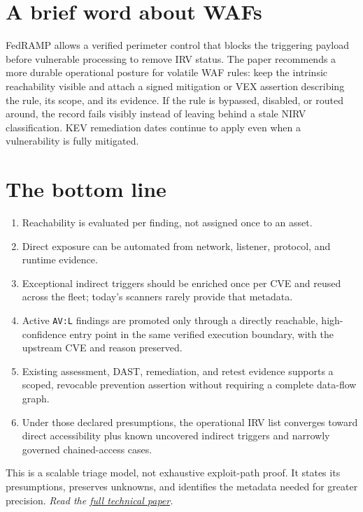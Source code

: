 \documentclass[11pt]{article}
\newcommand{\code}[1]{\texttt{#1}}
\begin{document}
\section*{A brief word about WAFs}
FedRAMP allows a verified perimeter control that blocks the triggering payload
before vulnerable processing to remove IRV status. The paper recommends a more
durable operational posture for volatile WAF rules: keep the intrinsic
reachability visible and attach a signed mitigation or VEX assertion describing
the rule, its scope, and its evidence. If the rule is bypassed, disabled, or
routed around, the record fails visibly instead of leaving behind a stale NIRV
classification. KEV remediation dates continue to apply even when a vulnerability
is fully mitigated.

\section*{The bottom line}
\begin{enumerate}[leftmargin=1.8em]
\item Reachability is evaluated per finding, not assigned once to an asset.
\item Direct exposure can be automated from network, listener, protocol, and
  runtime evidence.
\item Exceptional indirect triggers should be enriched once per CVE and reused
  across the fleet; today's scanners rarely provide that metadata.
\item Active \code{AV:L} findings are promoted only through a directly reachable,
  high-confidence entry point in the same verified execution boundary, with the
  upstream CVE and reason preserved.
\item Existing assessment, DAST, remediation, and retest evidence supports a
  scoped, revocable prevention assertion without requiring a complete data-flow
  graph.
\item Under those declared presumptions, the operational IRV list converges
  toward direct accessibility plus known uncovered indirect triggers and
  narrowly governed chained-access cases.
\end{enumerate}

This is a scalable triage model, not exhaustive exploit-path proof. It states
its presumptions, preserves unknowns, and identifies the metadata needed for
greater precision. \emph{Read the
\href{https://stackarmor.github.io/rfc-fedramp-vdr/internet-reachability.pdf}{full
technical paper}.}
\end{document}
